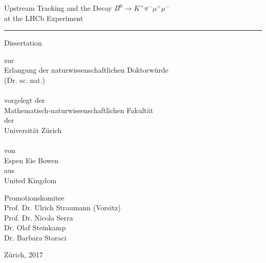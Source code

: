 \begin{titlepage}
 
\vspace*{-1.5cm}

\begin{center}
{\Large
Upstream Tracking and the Decay $B^{0} \to K^{+}\pi^{-}\mu^{+}\mu^{-}$\\ at the LHCb Experiment

\rule{\linewidth}{0.5pt}
}

\vspace*{1cm}

{\large
Dissertation \\
}

zur \\
Erlangung der naturwissenschaftlichen Doktorw\"urde \\ (Dr. sc. nat.) \\~\\
vorgelegt der \\ Mathematisch-naturwissenschaftlichen Fakult\"at \\
der \\
Universit\"at Z\"urich \\~\\
von \\
Espen Eie Bowen \\
aus \\
United Kingdom \\

\vspace*{1cm}

Promotionskomitee \\
Prof. Dr. Ulrich Straumann (Vorsitz) \\
Prof. Dr. Nicola Serra \\
Dr. Olaf Steinkamp \\
Dr. Barbara Storaci \\

\vspace*{1cm}

Z\"urich, 2017

\end{center}
\end{titlepage}